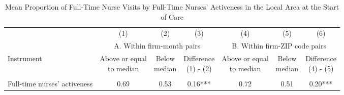 \documentclass[final,12pt]{article}
\begin{document}
\begin{singlespace}
\newpage
\begin{sidewaystable}[H]
\footnotesize
\setlength\tabcolsep{7pt}
\centering
\caption{Mean Proportion of Full-Time Nurse Visits by Full-Time Nurses' Activeness in the Local Area at the Start of Care}
\label{tab:activeness_predictivepower}
\begin{threeparttable}
\def\sym#1{\ifmmode^{#1}\else\(^{#1}\)\fi}
\begin{tabular}{l*{6}c}
\toprule
 & (1) & (2) & (3) & (4) & (5)  & (6) \\
& \multicolumn{3}{c}{A. Within firm-month pairs} &  \multicolumn{3}{c}{B. Within firm-ZIP code pairs} \\
\cmidrule(r{2pt}l{2pt}){2-4} \cmidrule(r{2pt}l{2pt}){5-7}
Instrument                 & \shortstack{Above or equal\\ to median}                                          & \shortstack{Below\\ median} & \shortstack{Difference\\(1) - (2)}       & \shortstack{Above or equal\\ to median}                                          & \shortstack{Below\\ median} & \shortstack{Difference\\(4) - (5)} \\
\midrule
\\
Full-time nurses' activeness                                   & 0.69 & 0.53 & 0.16*** & 0.72 & 0.51 & 0.20*** \\

\end{tabular}
\end{threeparttable}
\end{sidewaystable}
\end{singlespace}
\end{document}
